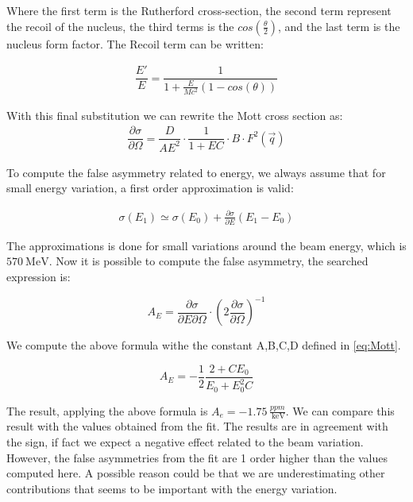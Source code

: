 Where the first term is the Rutherford cross-section, the second term represent the recoil of the nucleus, the third terms is the $cos(\frac{\theta}{2})$, and the last term is the nucleus form factor. The Recoil term can be written:

\begin{align*}
\dfrac{E'}{E} = \dfrac{1}{1 + \frac{E}{Mc^{2}} (1 - cos(\theta))}
\end{align*}

With this final substitution we can rewrite the Mott cross section as:
\begin{align*}
\dfrac{\partial \sigma}{\partial \Omega} = \dfrac{D}{AE^{2}} \cdot \dfrac{1}{1 + EC} \cdot B \cdot F^{2}(\vec{q})
\end{align*}
 
To compute the false asymmetry related to energy, we always assume that for small energy variation, a first order approximation is valid:

\begin{align*}
\sigma (E_{1}) \simeq \sigma(E_{0}) + \frac{\partial \sigma}{\partial E} (E_{1} - E_{0})
\end{align*}

The approximations is done for small variations around the beam energy, which is $\SI{570}{\mega \electronvolt}$.
Now it is possible to compute the false asymmetry, the searched expression is:

\begin{equation}
A_{E} = \dfrac{\partial \sigma}{\partial E \partial \Omega} \cdot  (2 \dfrac{\partial \sigma}{\partial \Omega})^{-1}
\end{equation}

We compute the above formula withe the constant A,B,C,D defined in \ref{eq:Mott}.

\begin{equation}
A_{E} = - \frac{1}{2} \dfrac{2 + CE_{0}}{E_{0} + E_{0}^{2}C} 
\end{equation}

The result, applying the above formula is $A_{e} = -1.75 \, \frac{ppm}{\SI{}{\kilo \electronvolt}}$. We can compare this result with the values obtained from the fit. The results are in agreement with the sign, if fact we expect a negative effect related to the beam variation. However, the false asymmetries from the fit are 1 order higher than the values computed here. A possible reason could be that we are underestimating other contributions that seems to be important with the energy variation.







